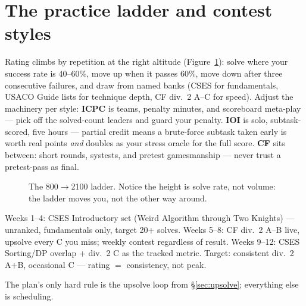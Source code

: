 \section{The practice ladder and contest styles}\label{sec:styles}
Rating climbs by repetition at the right altitude
(Figure~\ref{fig:ladder}): solve where your success rate is
40--60\%, move up when it passes 60\%, move down after three
consecutive failures, and draw from named banks (CSES for
fundamentals, USACO Guide lists for technique depth, CF
div.~2 A--C for speed). Adjust the machinery per style:
\textbf{ICPC} is teams, penalty minutes, and scoreboard
meta-play --- pick off the solved-count leaders and guard
your penalty. \textbf{IOI} is solo, subtask-scored, five
hours --- partial credit means a brute-force subtask taken
early is worth real points \emph{and} doubles as your stress
oracle for the full score. \textbf{CF} sits between: short
rounds, systests, and pretest gamesmanship --- never trust a
pretest-pass as final.
\begin{figure}[ht]\centering

\caption{The 800$\to$2100 ladder. Notice the height is solve
rate, not volume: the ladder moves you, not the other way
around.}
\label{fig:ladder}
\end{figure}

\begin{example}
Weeks 1--4: CSES Introductory set (Weird Algorithm through
Two Knights) --- unranked, fundamentals only, target 20+
solves. Weeks 5--8: CF div.~2 A--B live, upsolve every C you
miss; weekly contest regardless of result. Weeks 9--12:
CSES Sorting/DP overlap + div.~2 C as the tracked metric.
Target: consistent div.~2 A+B, occasional C --- rating
$=$ consistency, not peak.
\end{example}
\begin{solution}
The plan's only hard rule is the upsolve loop from
\S\ref{sec:upsolve}; everything else is scheduling.
\end{solution}


